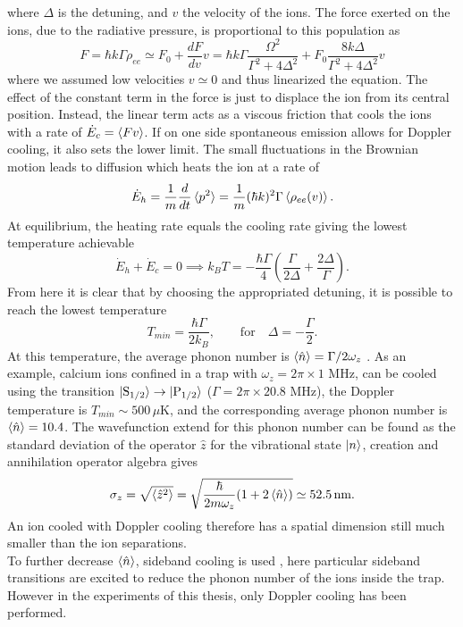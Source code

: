where $\Delta$ is the detuning, and $v$ the velocity of the ions. The force exerted on the ions, due to the radiative pressure, is proportional to this population as
\begin{equation}
F = \hbar k \Gamma \rho_{ee} \simeq F_0 + \frac{dF}{dv}v = \hbar k \Gamma\frac{\Omega^2}{\Gamma^2 +4\Delta^2} + F_0 \frac{8k\Delta}{\Gamma^2 + 4\Delta^2}v
\end{equation}
where we assumed low velocities $v \simeq 0$ and thus linearized the equation. The effect of the constant term in the force is just to displace the ion from its central position. Instead, the linear term acts as a viscous friction that cools the ions with a rate of $\dot{E}_c = \braket{Fv}$.
If on one side spontaneous emission allows for Doppler cooling, it also sets the lower limit. The small fluctuations in the Brownian motion leads to diffusion which heats the ion at a rate of
\begin{equation}
\dot{E}_h = \frac{1}{m}\frac{d}{dt}\braket{p^2} =  \frac{1}{m}(\hbar k)^2 \Gamma \braket{\rho_{ee}(v)}.
\end{equation}
At equilibrium, the heating rate equals the cooling rate giving the lowest temperature achievable
\begin{equation}
\dot{E}_h + \dot{E}_c = 0  \implies k_B T = -\frac{\hbar \Gamma}{4}\left(\frac{\Gamma}{2\Delta} +\frac{2\Delta}{\Gamma}\right).
\end{equation}
From here it is clear that by choosing the appropriated detuning, it is possible to reach the lowest temperature
\begin{equation}
T_{min} = \frac{\hbar \Gamma}{2k_{B}}, \qquad \text{for} \quad \Delta = -\frac{\Gamma}{2}.
\end{equation}
At this temperature, the average phonon number is $\braket{\hat{n}} = \Gamma /2\omega_z$ \cite{Eschner:03}. As an example, calcium ions confined in a trap with $\omega_z = 2\pi\times 1$ MHz, can be cooled using the transition $\ket{\text{S}_{1/2}}\to \ket{\text{P}_{1/2}}$ ($\Gamma = 2\pi\times 20.8$ MHz), the Doppler temperature is $T_{min} \sim 500\,\mu$K, and the corresponding average phonon number is $\braket{\hat{n}} = 10.4$. The wavefunction extend for this phonon number can be found as the standard deviation of the operator $\hat{z}$ for the vibrational state $\ket{n}$, creation and annihilation operator algebra gives
\begin{equation}
\sigma_z = \sqrt{\braket{\hat{z}^2}} = \sqrt{\frac{\hbar}{2m\omega_z}(1+2\braket{\hat{n}})} \simeq 52.5\,\text{nm}.
\end{equation}
An ion cooled with Doppler cooling therefore has a spatial dimension still much smaller than the ion separations.\\
To further decrease $\braket{\hat{n}}$, sideband cooling is used \cite{Eschner:03}, here particular sideband transitions are excited to reduce the phonon number of the ions inside the trap. However in the experiments of this thesis, only Doppler cooling has been performed.\\


